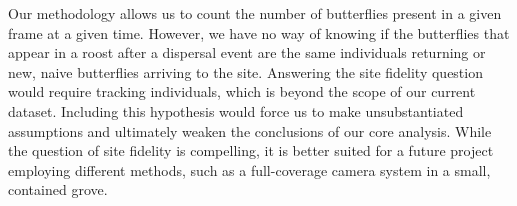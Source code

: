 Our methodology allows us to count the number of butterflies present in a given frame at a given time. However, we have no way of knowing if the butterflies that appear in a roost after a dispersal event are the same individuals returning or new, naive butterflies arriving to the site. Answering the site fidelity question would require tracking individuals, which is beyond the scope of our current dataset. Including this hypothesis would force us to make unsubstantiated assumptions and ultimately weaken the conclusions of our core analysis. While the question of site fidelity is compelling, it is better suited for a future project employing different methods, such as a full-coverage camera system in a small, contained grove.